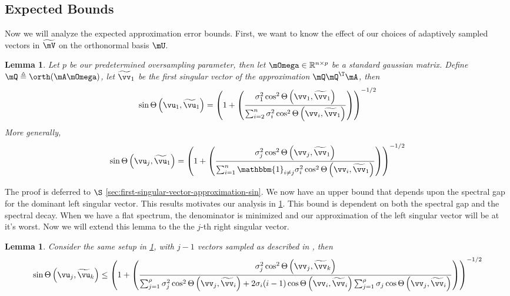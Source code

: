 \documentclass[10pt]{article}
\newcommand{\ccref}[1]{\textcolor{darkred}{\cref{#1}}}
\newcommand{\Ccref}[1]{\textcolor{darkred}{\Cref{#1}}}
\theoremstyle{plain}
\newtheorem{lemma}[theorem]{Lemma}
\theoremstyle{definition}
\theoremstyle{remark}
\begin{document}
\subsection{Expected Bounds}
Now we will analyze the expected approximation error bounds. First, we want to know the effect of our choices of adaptively sampled vectors in $\widetilde{\mV}$ on the orthonormal basis $\mU$. 
\begin{lemma} \label{lem:first-singular-vector-approximation-sin}
	Let $p$ be our predetermined oversampling parameter, then let $\mOmega \in \mathbb{R}^{n \times p}$ be a standard gaussian matrix. Define $\mQ \triangleq \orth(\mA\mOmega)$, let $\widetilde{\vv}_1$ be the first singular vector of the approximation $\mQ\mQ^{\T}\mA$, then 
	\begin{equation}
		\sin\Theta\left(\vu_1,\widetilde{\vu}_1\right) = \left(1 + \left(\frac{\sigma_1^2\cos^2\Theta\left(\vv_1,\widetilde{\vv}_1\right)}{\sum_{i=2}^n \sigma_i^2\cos^2\Theta\left(\vv_i,\widetilde{\vv}_1\right)}\right)\right)^{-1/2}
	\end{equation}
	More generally, 
	\begin{equation}
		\sin\Theta\left(\vu_j,\widetilde{\vu}_1\right) = \left(1 + \left(\frac{\sigma_j^2\cos^2\Theta\left(\vv_j,\widetilde{\vv}_1\right)}{\sum_{i=1}^n \mathbbm{1}_{i \neq j} \sigma_i^2\cos^2\Theta\left(\vv_i,\widetilde{\vv}_1\right)}\right)\right)^{-1/2}
	\end{equation}
\end{lemma}
The proof is deferred to $\S$ \ccref{sec:first-singular-vector-approximation-sin}. 
We now have an upper bound that depends upon the spectral gap for the dominant left singular vector. This results motivates our analysis in \ccref{lem:kth-singular-vector-approximation-sin}. This bound is dependent on both the spectral gap and the spectral decay. When we have a flat spectrum, the denominator is minimized and our approximation of the left singular vector will be at it's worst. Now we will extend this lemma to the the $j$-th right singular vector. 
\begin{lemma} \label{lem:kth-singular-vector-approximation-sin}
	Consider the same setup in \ccref{lem:first-singular-vector-approximation-sin}, with $j-1$ vectors sampled as described in \Ccref{alg:optimal-sampling}, then 
	\begin{equation}
		\sin\Theta\left(\vu_j,\widetilde{\vu}_k\right) \leq \left(1 + \left(\frac{\sigma_j^2\cos^2\Theta\left(\vv_j,\widetilde{\vv}_k\right)}{\sum_{j=1}^\rho \sigma_j^2\cos^2\Theta\left(\vv_j,\widetilde{\vv}_i\right) + 2 \sigma_{i}(i-1)\cos\Theta\left(\vv_i,\widetilde{\vv}_i\right)\sum_{j=1}^{\rho}\sigma_j\cos\Theta\left(\vv_j,\widetilde{\vv}_i\right)}\right)\right)^{-1/2}
	\end{equation}
\end{lemma}
\end{document}
